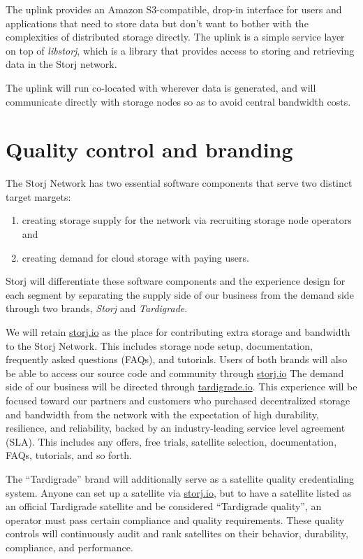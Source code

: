 \documentclass[11pt,fleqn,openany]{book}
\begin{document}
The uplink provides an Amazon S3-compatible, drop-in interface for users and
applications that
need to store data but don't want to bother with the complexities of distributed
storage directly. The uplink is a simple service layer on top of {\em libstorj},
which is a library that provides access to storing and retrieving data in the
Storj network.

The uplink will run co-located with wherever data is generated, and will
communicate directly with storage nodes so as to avoid central bandwidth costs.

\section{Quality control and branding}\label{sec:qc}

The Storj Network has two essential software components that serve two distinct
target margets:

\begin{enumerate}
\item creating storage supply for the network via recruiting storage node
  operators and
\item creating demand for cloud storage with paying users.
\end{enumerate}

Storj will differentiate these software components and the experience design
for each segment by separating the supply side of our business from the
demand side through two brands, {\em Storj} and {\em Tardigrade}.

We will retain \url{storj.io} as the place for contributing extra storage and
bandwidth to the Storj Network. This includes storage node setup, documentation,
frequently asked questions (FAQs), and tutorials. Users of both brands will also be able to
access our source code and community through \url{storj.io}
The demand side of our business will be directed through \url{tardigrade.io}.
This experience will be focused toward our partners and customers who purchased
decentralized storage and bandwidth from the network with the expectation of
high durability, resilience, and reliability, backed by an industry-leading
service level agreement (SLA). This includes any offers, free trials, satellite
selection, documentation, FAQs, tutorials, and so forth.

The ``Tardigrade'' brand will additionally serve as a satellite quality
credentialing system. Anyone can set up a satellite via
\url{storj.io}, but to have a satellite listed as an official Tardigrade
satellite and be considered ``Tardigrade quality'', an operator must pass
certain compliance and quality requirements.
These quality controls will continuously audit and rank satellites on their
behavior, durability, compliance, and performance.
\end{document}
